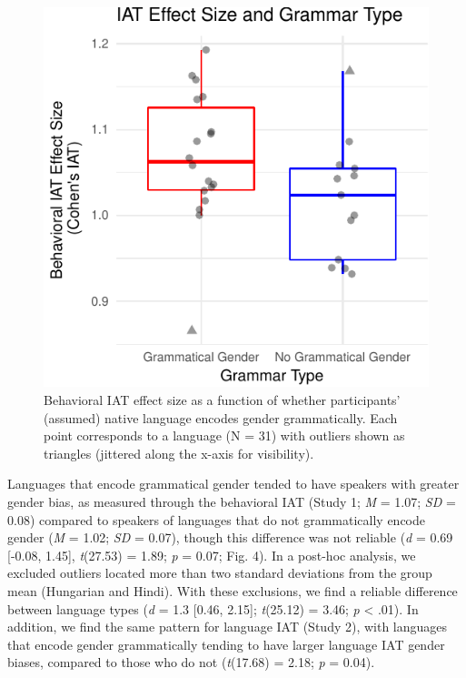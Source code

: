 \documentclass[10pt, letterpaper]{article}
\newenvironment{CodeChunk}{}{}
\begin{document}
\begin{CodeChunk}
\begin{figure}[t]

{\centering \includegraphics{figs/grammatical_gender_plot-1} 

}

\caption[Behavioral IAT effect size as a function of whether participants' (assumed) native language encodes gender grammatically]{Behavioral IAT effect size as a function of whether participants' (assumed) native language encodes gender grammatically. Each point corresponds to a language (N = 31) with outliers shown as triangles (jittered along the x-axis for visibility).}\label{fig:grammatical_gender_plot}
\end{figure}
\end{CodeChunk}

Languages that encode grammatical gender tended to have speakers with
greater gender bias, as measured through the behavioral IAT (Study 1;
\emph{M} = 1.07; \emph{SD} = 0.08) compared to speakers of languages
that do not grammatically encode gender (\emph{M} = 1.02; \emph{SD} =
0.07), though this difference was not reliable (\emph{d} = 0.69
{[}-0.08, 1.45{]}, \emph{t}(27.53) = 1.89; \emph{p} = 0.07; Fig. 4). In
a post-hoc analysis, we excluded outliers located more than two standard
deviations from the group mean (Hungarian and Hindi). With these
exclusions, we find a reliable difference between language types
(\emph{d} = 1.3 {[}0.46, 2.15{]}; \emph{t}(25.12) = 3.46; \emph{p}
\textless{} .01). In addition, we find the same pattern for language IAT
(Study 2), with languages that encode gender grammatically tending to
have larger language IAT gender biases, compared to those who do not
(\emph{t}(17.68) = 2.18; \emph{p} = 0.04).
\end{document}
